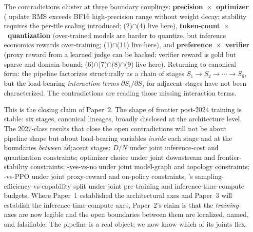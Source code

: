 \begin{intuition}
The contradictions cluster at three boundary couplings:
\textbf{precision~$\times$~optimizer} ( update RMS exceeds BF16
high-precision range without weight decay;  stability requires
the per-tile scaling  introduced; (2)$\cap$(4) live here),
\textbf{token-count~$\times$~quantization} (over-trained models are
harder to quantize, but inference economics rewards
over-training; (1)$\cap$(11) live here), and
\textbf{preference~$\times$~verifier} (proxy reward from a learned
judge can be hacked; verifier reward is gold but sparse and
domain-bound; (6)$\cap$(7)$\cap$(8)$\cap$(9) live here). Returning
to canonical form: the pipeline factorizes structurally as a chain of
stages $S_1 \to S_2 \to \cdots \to S_6$, but the load-bearing
\emph{interaction terms} $\partial S_i / \partial S_j$ for adjacent
stages have not been characterized. The contradictions are reading
those missing interaction terms.
\end{intuition}

This is the closing claim of Paper~2. The shape of frontier
post-2024  training is stable: six stages, canonical lineages,
broadly disclosed at the architecture level. The 2027-class results
that close the open contradictions will not be about pipeline shape
but about load-bearing variables \emph{inside} each stage and at the
boundaries \emph{between} adjacent stages: $D / N$ under joint
inference-cost and quantization constraints; optimizer choice under
joint downstream and frontier-stability constraints; -yes-vs-no
under joint model-graph and topology constraints; -vs-PPO under
joint proxy-reward and on-policy constraints; 's
sampling-efficiency-vs-capability split under joint pre-training
and inference-time-compute budgets. Where Paper~1 established the
architectural axes and Paper~3 will establish the
inference-time-compute axes, Paper~2's claim is that the
\emph{training} axes are now legible and the open boundaries between
them are localized, named, and falsifiable. The pipeline is a real
object; we now know which of its joints flex.
